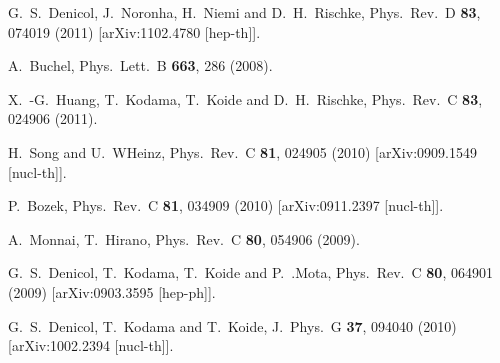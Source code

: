 \begin{thebibliography}{99}
  G.~S.~Denicol, J.~Noronha, H.~Niemi and D.~H.~Rischke,
  Phys.\ Rev.\ D {\bf 83}, 074019 (2011)
  [arXiv:1102.4780 [hep-th]].
  

  A.~Buchel,
  Phys.\ Lett.\ B {\bf 663}, 286 (2008).
  
  X.~-G.~Huang, T.~Kodama, T.~Koide and D.~H.~Rischke,
  Phys.\ Rev.\ C {\bf 83}, 024906 (2011).

  
  H.~Song and U.~WHeinz,
  Phys.\ Rev.\ C {\bf 81}, 024905 (2010)
  [arXiv:0909.1549 [nucl-th]].
  
  P.~Bozek,
  Phys.\ Rev.\ C {\bf 81}, 034909 (2010)
  [arXiv:0911.2397 [nucl-th]].

  A.~Monnai, T.~Hirano,
  Phys.\ Rev.\ C {\bf 80}, 054906 (2009).

  G.~S.~Denicol, T.~Kodama, T.~Koide and P.~.Mota,
  Phys.\ Rev.\ C {\bf 80}, 064901 (2009)
  [arXiv:0903.3595 [hep-ph]].
  
  G.~S.~Denicol, T.~Kodama and T.~Koide,
  J.\ Phys.\ G {\bf 37}, 094040 (2010)
  [arXiv:1002.2394 [nucl-th]].
  

\end{thebibliography}

